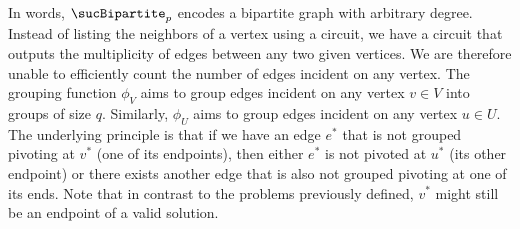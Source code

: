 In words, $\sucBipartite_p$ encodes a bipartite graph with arbitrary degree. Instead of listing the neighbors of a vertex using a circuit, we have a circuit that outputs the multiplicity of edges between any two given vertices. We are therefore unable to efficiently count the number of edges incident on any vertex. The grouping function $\phi_V$ aims to group edges incident on any vertex $v \in V$ into groups of size $q$. Similarly, $\phi_U$ aims to group edges incident on any vertex $u \in U$. The underlying principle is that if we have an edge $e^*$ that is not grouped pivoting at $v^*$ (one of its endpoints), then either $e^*$ is not pivoted at $u^*$ (its other endpoint) or there exists another edge that is also not grouped pivoting at one of its ends. Note that in contrast to the problems previously defined, $v^*$ might still be an endpoint of a valid solution.

